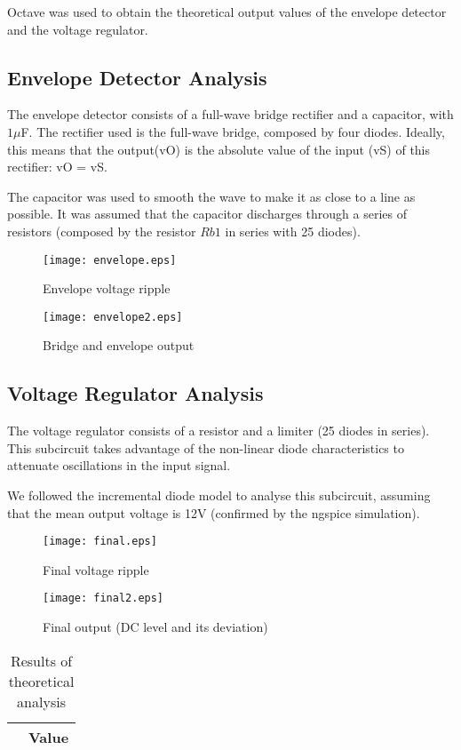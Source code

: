 Octave was used to obtain the theoretical output values of the envelope detector and the voltage regulator. 



\subsection{Envelope Detector Analysis}

The envelope detector consists of a full-wave bridge rectifier and a capacitor, with $1\mu$F.
The rectifier used is the full-wave bridge, composed by four diodes. Ideally, this means that the output(vO) is the absolute value of the input (vS) of this rectifier: vO = \textbar vS\textbar.

The capacitor was used to smooth the wave to make it as close to a line as possible. It was assumed that the capacitor discharges through a series of resistors (composed by the resistor $Rb1$ in series with 25 diodes).

\begin{figure}[h] \centering
  \begin{minipage}{.5\textwidth}
    \texttt{[image: envelope.eps]}
    \caption{Envelope voltage ripple}
    \label{fig:simenv}
    \end{minipage}%
  \begin{minipage}{.5\textwidth}
  \centering
    \texttt{[image: envelope2.eps]}
    \caption{Bridge and envelope output}
    \label{fig:compenv}
      \end{minipage}%
\end{figure}




\subsection{Voltage Regulator Analysis}

The voltage regulator consists of a resistor and a limiter (25 diodes in series). This subcircuit takes advantage of the non-linear diode characteristics to attenuate oscillations in the input signal.

We followed the incremental diode model to analyse this subcircuit, assuming that the mean output voltage is 12V (confirmed by the ngspice simulation).


\begin{figure}[h] \centering
  \begin{minipage}{.5\textwidth}
    \texttt{[image: final.eps]}
    \caption{Final voltage ripple}
    \label{fig:simenv}
    \end{minipage}%
  \begin{minipage}{.5\textwidth}
  \centering
    \texttt{[image: final2.eps]}
    \caption{Final output (DC level and its deviation)}
    \label{fig:compenv}
      \end{minipage}%
\end{figure}



\begin{table}[h]
  \centering
  \begin{tabular}{|c|c|}
    \hline    
     & { Value} \\ \hline
    
 \end{tabular}
 \caption{Results of theoretical analysis}
  \label{tab:op2}
\end{table}
